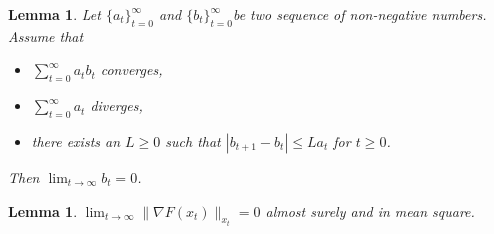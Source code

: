 \documentclass{amsart}
\theoremstyle{plain}
\newtheorem{lemma}[theorem]{Lemma}
\theoremstyle{definition}
\theoremstyle{remark}
\numberwithin{theorem}{section}
\numberwithin{equation}{section}
\begin{document}
\begin{lemma}\cite[Proposition 2]{Alber-Iusem-Solodov} \cite[Lemma A.5]{Mairal} \label{lemma-Li-Orabona-1}
Let $\{a_t\}_{t=0}^\infty$ and $\{b_t\}_{t=0}^\infty$be two sequence of non-negative numbers. Assume that 
\begin{itemize}
	\item $\sum_{t=0}^\infty a_t b_t$ converges,
	\item $\sum_{t=0}^\infty a_t$ diverges,
	\item there exists an $L\geq 0$ such that $|b_{t+1}-b_t|\leq L a_t$ for $t\geq 0$. 
\end{itemize}
Then $\lim_{t\rightarrow \infty} b_t =0$.
\end{lemma}

\begin{lemma}\label{lemma-nabla-F-x-t-converge}
$\lim_{t \rightarrow \infty} \|\nabla F(x_t)\|_{x_t} =0$ almost surely and in mean square.
\end{lemma}
\end{document}

